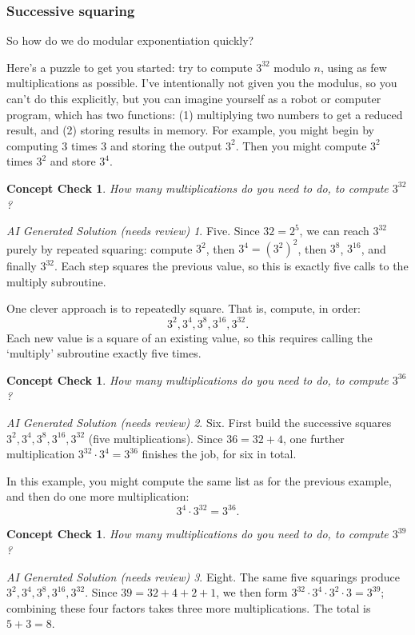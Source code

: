 \documentclass{article}
\theoremstyle{plain}
\newtheorem{checkin}[theorem]{Concept Check}
\theoremstyle{definition}
\theoremstyle{remark}
\newtheorem*{aisolution}{AI Generated Solution (needs review)}
\numberwithin{theorem}{section}
\begin{document}
\subsubsection{Successive squaring}

So how do we do modular exponentiation quickly?

Here's a puzzle to get you started:  try to compute $3^{32}$ modulo $n$, using as few multiplications as possible.  I've intentionally not given you the modulus, so you can't do this explicitly, but you can imagine yourself as a robot or computer program, which has two functions:  (1) multiplying two numbers to get a reduced result, and (2) storing results in memory.  For example, you might begin by computing $3$ times $3$ and storing the output $3^2$.  Then you might compute $3^2$ times $3^2$ and store $3^4$.

\begin{checkin}
        How many multiplications do you need to do, to compute $3^{32}$?
\end{checkin}
\begin{aisolution}
Five.  Since $32 = 2^5$, we can reach $3^{32}$ purely by repeated squaring: compute $3^2$, then $3^4 = (3^2)^2$, then $3^8$, $3^{16}$, and finally $3^{32}$.  Each step squares the previous value, so this is exactly five calls to the multiply subroutine.
\end{aisolution}


One clever approach is to repeatedly square.  That is, compute, in order:
\[
3^2, 3^4, 3^8, 3^{16}, 3^{32}.
\]
Each new value is a square of an existing value, so this requires calling the `multiply' subroutine exactly five times.

\begin{checkin}
    How many multiplications do you need to do, to compute $3^{36}$?
\end{checkin}
\begin{aisolution}
Six.  First build the successive squares $3^2, 3^4, 3^8, 3^{16}, 3^{32}$ (five multiplications).  Since $36 = 32 + 4$, one further multiplication $3^{32}\cdot 3^4 = 3^{36}$ finishes the job, for six in total.
\end{aisolution}

In this example, you might compute the same list as for the previous example, and then do one more multiplication:
\[
3^4 \cdot 3^{32} = 3^{36}.
\]

\begin{checkin}
    How many multiplications do you need to do, to compute $3^{39}$?
\end{checkin}
\begin{aisolution}
Eight.  The same five squarings produce $3^2, 3^4, 3^8, 3^{16}, 3^{32}$.  Since $39 = 32 + 4 + 2 + 1$, we then form $3^{32}\cdot 3^4 \cdot 3^2 \cdot 3 = 3^{39}$; combining these four factors takes three more multiplications.  The total is $5 + 3 = 8$.
\end{aisolution}
\end{document}
